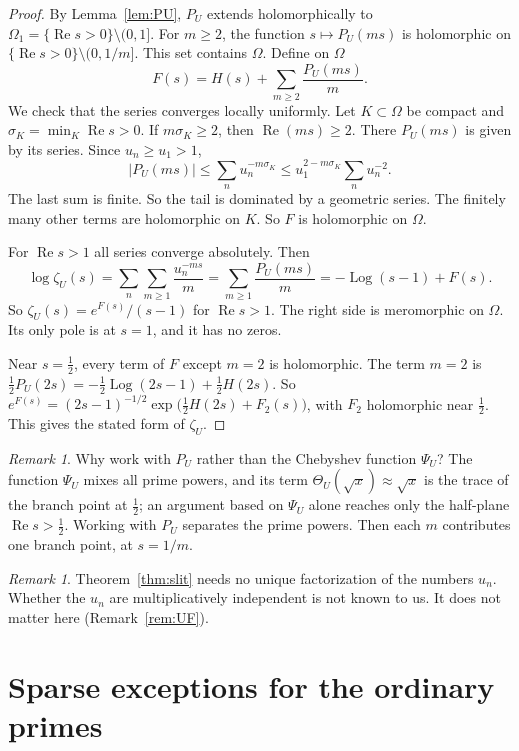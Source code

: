 \documentclass[12pt,letterpaper]{article}
\theoremstyle{definition}
\theoremstyle{remark}
\newtheorem{remark}[theorem]{Remark}
\numberwithin{equation}{section}
\newcommand{\Log}{\operatorname{Log}}
\newcommand{\Ree}{\operatorname{Re}}
\begin{document}
\begin{proof}
By Lemma~\ref{lem:PU}, $P_U$ extends holomorphically to
$\Omega_1=\{\Ree s>0\}\setminus(0,1]$. For $m\ge2$, the function
$s\mapsto P_U(ms)$ is holomorphic on $\{\Ree s>0\}\setminus(0,1/m]$. This
set contains $\Omega$. Define on $\Omega$
\[
F(s)=H(s)+\sum_{m\ge2}\frac{P_U(ms)}{m}.
\]
We check that the series converges locally uniformly. Let $K\subset\Omega$
be compact and $\sigma_K=\min_K\Ree s>0$. If $m\sigma_K\ge2$, then
$\Ree(ms)\ge2$. There $P_U(ms)$ is given by its series. Since $u_n\ge u_1>1$,
\[
|P_U(ms)|\le\sum_n u_n^{-m\sigma_K}
\le u_1^{2-m\sigma_K}\sum_n u_n^{-2}.
\]
The last sum is finite. So the tail is dominated by a geometric series.
The finitely many other terms are holomorphic on $K$. So $F$ is
holomorphic on $\Omega$.

For $\Ree s>1$ all series converge absolutely. Then
\[
\log\zeta_U(s)=\sum_n\sum_{m\ge1}\frac{u_n^{-ms}}{m}
=\sum_{m\ge1}\frac{P_U(ms)}{m}=-\Log(s-1)+F(s).
\]
So $\zeta_U(s)=e^{F(s)}/(s-1)$ for $\Ree s>1$. The right side is
meromorphic on $\Omega$. Its only pole is at $s=1$, and it has no zeros.

Near $s=\frac12$, every term of $F$ except $m=2$ is holomorphic. The term
$m=2$ is $\tfrac12P_U(2s)=-\tfrac12\Log(2s-1)+\tfrac12H(2s)$. So
$e^{F(s)}=(2s-1)^{-1/2}\exp\bigl(\tfrac12H(2s)+F_2(s)\bigr)$, with $F_2$
holomorphic near $\frac12$. This gives the stated form of $\zeta_U$.
\end{proof}

\begin{remark}
Why work with $P_U$ rather than the Chebyshev function $\Psi_U$? The
function $\Psi_U$ mixes all prime powers, and its term
$\Theta_U(\sqrt{x})\approx\sqrt{x}$ is the trace of the branch point at
$\frac12$; an argument based on $\Psi_U$ alone reaches only the half-plane
$\Ree s>\frac12$. Working with $P_U$ separates the prime powers. Then
each $m$ contributes one branch point, at $s=1/m$.
\end{remark}

\begin{remark}
Theorem~\ref{thm:slit} needs no unique factorization of the numbers
$u_n$. Whether the $u_n$ are multiplicatively independent is not known to
us. It does not matter here (Remark~\ref{rem:UF}).
\end{remark}

\section{Sparse exceptions for the ordinary primes}\label{sec:sparse}
\end{document}

